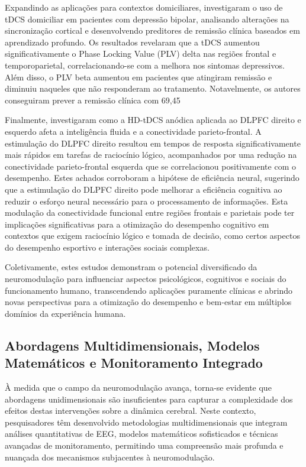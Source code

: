 Expandindo as aplicações para contextos domiciliares,  investigaram o uso de tDCS domiciliar em pacientes com depressão bipolar, analisando alterações na sincronização cortical e desenvolvendo preditores de remissão clínica baseados em aprendizado profundo. Os resultados revelaram que a tDCS aumentou significativamente o Phase Locking Value (PLV) delta nas regiões frontal e temporoparietal, correlacionando-se com a melhora nos sintomas depressivos. Além disso, o PLV beta aumentou em pacientes que atingiram remissão e diminuiu naqueles que não responderam ao tratamento. Notavelmente, os autores conseguiram prever a remissão clínica com 69,45%

Finalmente,  investigaram como a HD-tDCS anódica aplicada ao DLPFC direito e esquerdo afeta a inteligência fluida e a conectividade parieto-frontal. A estimulação do DLPFC direito resultou em tempos de resposta significativamente mais rápidos em tarefas de raciocínio lógico, acompanhados por uma redução na conectividade parieto-frontal esquerda que se correlacionou positivamente com o desempenho. Estes achados corroboram a hipótese de eficiência neural, sugerindo que a estimulação do DLPFC direito pode melhorar a eficiência cognitiva ao reduzir o esforço neural necessário para o processamento de informações. Esta modulação da conectividade funcional entre regiões frontais e parietais pode ter implicações significativas para a otimização do desempenho cognitivo em contextos que exigem raciocínio lógico e tomada de decisão, como certos aspectos do desempenho esportivo e interações sociais complexas.

Coletivamente, estes estudos demonstram o potencial diversificado da neuromodulação para influenciar aspectos psicológicos, cognitivos e sociais do funcionamento humano, transcendendo aplicações puramente clínicas e abrindo novas perspectivas para a otimização do desempenho e bem-estar em múltiplos domínios da experiência humana.

\subsection{Abordagens Multidimensionais, Modelos Matemáticos e Monitoramento Integrado}
À medida que o campo da neuromodulação avança, torna-se evidente que abordagens unidimensionais são insuficientes para capturar a complexidade dos efeitos destas intervenções sobre a dinâmica cerebral. Neste contexto, pesquisadores têm desenvolvido metodologias multidimensionais que integram análises quantitativas de EEG, modelos matemáticos sofisticados e técnicas avançadas de monitoramento, permitindo uma compreensão mais profunda e nuançada dos mecanismos subjacentes à neuromodulação.

